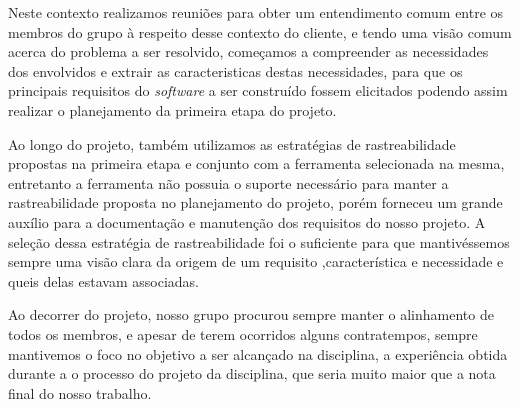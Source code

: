 Neste contexto realizamos reuniões para obter um entendimento comum entre os membros do grupo à respeito desse contexto do cliente, e tendo uma visão comum acerca do problema a ser resolvido, começamos a compreender as necessidades dos envolvidos e extrair as caracteristicas destas necessidades, para que os principais requisitos do \textit{software} a ser construído fossem elicitados podendo assim realizar o planejamento da primeira etapa do projeto.

Ao longo do projeto, também utilizamos as estratégias de rastreabilidade propostas na primeira etapa e conjunto com a ferramenta selecionada na mesma, entretanto a ferramenta não possuia o suporte necessário para manter a rastreabilidade proposta no planejamento do projeto, porém forneceu um grande auxílio para a documentação e manutenção dos requisitos do nosso projeto. A seleção dessa estratégia de rastreabilidade foi o suficiente para que mantivéssemos sempre uma visão clara da origem de um requisito ,característica e necessidade e queis delas estavam associadas.

Ao decorrer do projeto, nosso grupo procurou sempre manter o alinhamento de todos os membros, e apesar de terem ocorridos alguns contratempos, sempre mantivemos  o foco no objetivo a ser alcançado na disciplina, a experiência obtida durante a o processo do projeto da disciplina, que seria muito maior que a nota final do nosso trabalho. 
